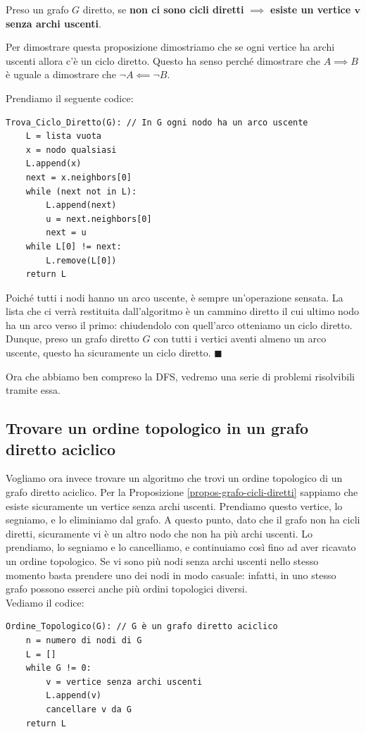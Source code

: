 \documentclass[11pt, a4paper, titlepage, oneside]{scrbook}
\begin{document}
\begin{Proposizione}[]
\label{propos-grafo-cicli-diretti}
Preso un grafo $G$ diretto, se \textbf{non ci sono cicli diretti} $\implies$ \textbf{esiste un vertice $\bm{v}$ senza archi uscenti}.
\end{Proposizione}

\Dimostrazione \nopagebreak

Per dimostrare questa proposizione dimostriamo che se ogni vertice ha archi uscenti allora c'è un ciclo diretto. Questo ha senso perché dimostrare che $A \implies B$ è uguale a dimostrare che $\neg A \impliedby \neg B$.

Prendiamo il seguente codice:
\begin{lstlisting}[style=Python]
Trova_Ciclo_Diretto(G): // In G ogni nodo ha un arco uscente
    L = lista vuota
    x = nodo qualsiasi
    L.append(x)
    next = x.neighbors[0]
    while (next not in L):
        L.append(next)
        u = next.neighbors[0]
        next = u
    while L[0] != next:
        L.remove(L[0])
    return L
\end{lstlisting}

Poiché tutti i nodi hanno un arco uscente,  è sempre un'operazione sensata. La lista che ci verrà restituita dall'algoritmo è un cammino diretto il cui ultimo nodo ha un arco verso il primo: chiudendolo con quell'arco otteniamo un ciclo diretto. Dunque, preso un grafo diretto $G$ con tutti i vertici aventi almeno un arco uscente, questo ha sicuramente un ciclo diretto. $\blacksquare$


Ora che abbiamo ben compreso la DFS, vedremo una serie di problemi risolvibili tramite essa.

\subsection{Trovare un ordine topologico in un grafo diretto aciclico}

Vogliamo ora invece trovare un algoritmo che trovi un ordine topologico di un grafo diretto aciclico. Per la Proposizione \ref{propos-grafo-cicli-diretti} sappiamo che esiste sicuramente un vertice senza archi uscenti. Prendiamo questo vertice, lo segniamo, e lo eliminiamo dal grafo. A questo punto, dato che il grafo non ha cicli diretti, sicuramente vi è un altro nodo che non ha più archi uscenti. Lo prendiamo, lo segniamo e lo cancelliamo, e continuiamo così fino ad aver ricavato un ordine topologico. Se vi sono più nodi senza archi uscenti nello stesso momento basta prendere uno dei nodi in modo casuale: infatti, in uno stesso grafo possono esserci anche più ordini topologici diversi. \\
Vediamo il codice:
\begin{lstlisting}[style=Python]
Ordine_Topologico(G): // G è un grafo diretto aciclico
    n = numero di nodi di G
    L = []
    while G != 0:
        v = vertice senza archi uscenti
        L.append(v)
        cancellare v da G
    return L
\end{lstlisting}
\end{document}
